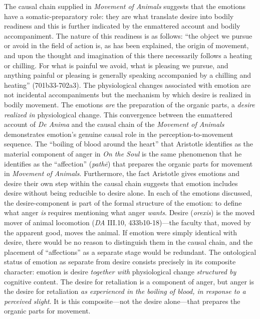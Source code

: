 \documentclass{article}
\begin{document}
The causal chain supplied in \textit{Movement of Animals} suggests that the emotions have a somatic-preparatory role: they are what translate desire into bodily readiness and this is further indicated by the enmattered account and bodily accompaniment. The nature of this readiness is as follows: ``the object we pursue or avoid in the field of action is, as has been explained, the origin of movement, and upon the thought and imagination of this there necessarily follows a heating or chilling. For what is painful we avoid, what is pleasing we pursue, and anything painful or pleasing is generally speaking accompanied by a chilling and heating'' (701b33-702a3). The physiological changes associated with emotion are not incidental accompaniments but the mechanism by which desire is realized in bodily movement. The emotions \textit{are} the preparation of the organic parts, a \textit{desire realized in} physiological change. This convergence between the enmattered account of \textit{De Anima} and the causal chain of the \textit{Movement of Animals} demonstrates emotion's genuine causal role in the perception-to-movement sequence. The ``boiling of blood around the heart'' that Aristotle identifies as the material component of anger in \textit{On the Soul} is the same phenomenon that he identifies as the ``affection'' (\textit{pathē}) that prepares the organic parts for movement in \textit{Movement of Animals}. Furthermore, the fact Aristotle gives emotions and desire their own step within the causal chain suggests that emotion includes desire without being reducible to desire alone. In each of the emotions discussed, the desire-component is part of the formal structure of the emotion: to define what anger \textit{is} requires mentioning what anger \textit{wants}. Desire (\textit{orexis}) is the moved mover of animal locomotion (\textit{DA} III.10, 433b10-18)---the faculty that, moved by the apparent good, moves the animal. If emotion were simply identical with desire, there would be no reason to distinguish them in the causal chain, and the placement of ``affections'' as a separate stage would be redundant. The ontological status of emotion as separate from desire consists precisely in its composite character: emotion is desire \textit{together with} physiological change \textit{structured by} cognitive content. The desire for retaliation is a component of anger, but anger is the desire for retaliation \textit{as experienced in the boiling of blood, in response to a perceived slight}. It is this composite---not the desire alone---that prepares the organic parts for movement. 
\end{document}
